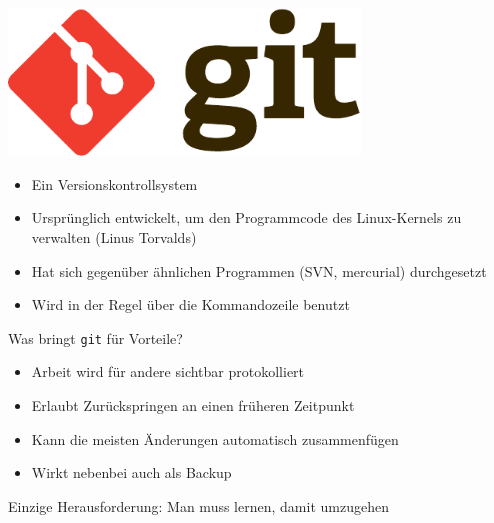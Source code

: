 \begin{frame}
    \centering
    \includegraphics[width=0.7\textwidth]{logos/git_logo.pdf}

    \vspace{1em}

    \begin{itemize}
      \item Ein Versionskontrollsystem
      \item Ursprünglich entwickelt, um den Programmcode des Linux-Kernels zu verwalten (Linus Torvalds)
      \item Hat sich gegenüber ähnlichen Programmen (SVN, mercurial) durchgesetzt
      \item Wird in der Regel über die Kommandozeile benutzt
    \end{itemize}
\end{frame}

\begin{frame}{Was bringt \texttt{git} für Vorteile?}
  \begin{itemize}
    \item Arbeit wird für andere sichtbar protokolliert
    \item Erlaubt Zurückspringen an einen früheren Zeitpunkt
    \item Kann die meisten Änderungen automatisch zusammenfügen
    \item Wirkt nebenbei auch als Backup
  \end{itemize}
  Einzige Herausforderung: Man muss lernen, damit umzugehen
\end{frame}

